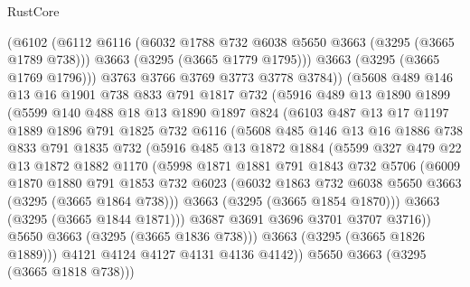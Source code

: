\begin{lexlean}{RustCore}
\begin{coremodule}
          (@6102
            (@6112
              @6116
              (@6032 @1788 @732 @6038 @5650 @3663 (@3295 (@3665 @1789 @738)))
              @3663
              (@3295 (@3665 @1779 @1795)))
            @3663
            (@3295 (@3665 @1769 @1796)))
          @3763
          @3766
          @3769
          @3773
          @3778
          @3784))
      (@5608
        @489
        @146
        @13
        @16
        @1901
        @738
        @833
        @791
        @1817
        @732
        (@5916
          @489
          @13
          @1890
          @1899
          (@5599
            @140
            @488
            @18
            @13
            @1890
            @1897
            @824
            (@6103
              @487
              @13
              @17
              @1197
              @1889
              @1896
              @791
              @1825
              @732
              @6116
              (@5608
                @485
                @146
                @13
                @16
                @1886
                @738
                @833
                @791
                @1835
                @732
                (@5916
                  @485
                  @13
                  @1872
                  @1884
                  (@5599
                    @327
                    @479
                    @22
                    @13
                    @1872
                    @1882
                    @1170
                    (@5998
                      @1871
                      @1881
                      @791
                      @1843
                      @732
                      @5706
                      (@6009
                        @1870
                        @1880
                        @791
                        @1853
                        @732
                        @6023
                        (@6032 @1863 @732 @6038 @5650 @3663 (@3295 (@3665 @1864 @738)))
                        @3663
                        (@3295 (@3665 @1854 @1870)))
                      @3663
                      (@3295 (@3665 @1844 @1871)))
                    @3687
                    @3691
                    @3696
                    @3701
                    @3707
                    @3716))
                @5650
                @3663
                (@3295 (@3665 @1836 @738)))
              @3663
              (@3295 (@3665 @1826 @1889)))
            @4121
            @4124
            @4127
            @4131
            @4136
            @4142))
        @5650
        @3663
        (@3295 (@3665 @1818 @738)))

\end{coremodule}
\end{lexlean}

